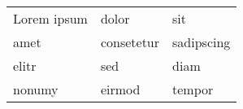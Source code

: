﻿\documentclass{article}
\begin{document}
\begin{table}[]
\centering
\caption{}
\label{tab:my-table}
\begin{tabular}{lll}
Lorem ipsum & dolor & sit \\
amet & consetetur & sadipscing \\
elitr & sed & diam \\
nonumy & eirmod & tempor
\end{tabular}
\end{table}
\end{document}

